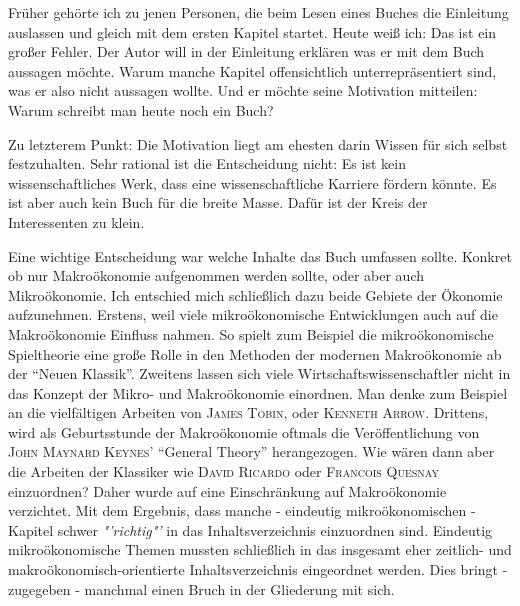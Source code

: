 %
%
%

\preface


Früher gehörte ich zu jenen Personen, die beim Lesen eines Buches die Einleitung auslassen und gleich mit dem ersten Kapitel startet. Heute weiß ich: Das ist ein großer Fehler. Der Autor will in der Einleitung erklären was er mit dem Buch aussagen möchte. Warum manche Kapitel offensichtlich unterrepräsentiert sind, was er also nicht aussagen wollte. Und er möchte seine Motivation mitteilen: Warum schreibt man heute noch ein Buch?

Zu letzterem Punkt: Die Motivation liegt am ehesten darin Wissen für sich selbst festzuhalten. Sehr rational ist die Entscheidung nicht: Es ist kein wissenschaftliches Werk, dass eine wissenschaftliche Karriere fördern könnte. Es ist aber auch kein Buch für die breite Masse. Dafür ist der Kreis der Interessenten zu klein.

Eine wichtige Entscheidung war welche Inhalte das Buch umfassen sollte. Konkret ob nur Makroökonomie aufgenommen werden sollte, oder aber auch Mikroökonomie. Ich entschied mich schließlich dazu beide Gebiete der Ökonomie aufzunehmen. Erstens, weil viele mikroökonomische Entwicklungen auch auf die Makroökonomie Einfluss nahmen. So spielt zum Beispiel die mikroökonomische Spieltheorie eine große Rolle in den Methoden der modernen Makroökonomie ab der "`Neuen Klassik"'. Zweitens lassen sich viele Wirtschaftswissenschaftler nicht in das Konzept der Mikro- und Makroökonomie einordnen. Man denke zum Beispiel an die vielfältigen Arbeiten von \textsc{James Tobin}, oder \textsc{Kenneth Arrow}. Drittens, wird als Geburtsstunde der Makroökonomie oftmals die Veröffentlichung von \textsc{John Maynard Keynes'} "`General Theory"' herangezogen. Wie wären dann aber die Arbeiten der Klassiker wie \textsc{David Ricardo} oder \textsc{Francois Quesnay} einzuordnen?
Daher wurde auf eine Einschränkung auf Makroökonomie verzichtet. Mit dem Ergebnis, dass manche - eindeutig mikroökonomischen - Kapitel schwer \textit{"'richtig"'} in das Inhaltsverzeichnis einzuordnen sind. Eindeutig mikroökonomische Themen mussten schließlich in das insgesamt eher zeitlich- und makroökonomisch-orientierte Inhaltsverzeichnis eingeordnet werden. Dies bringt - zugegeben - manchmal einen Bruch in der Gliederung mit sich.

